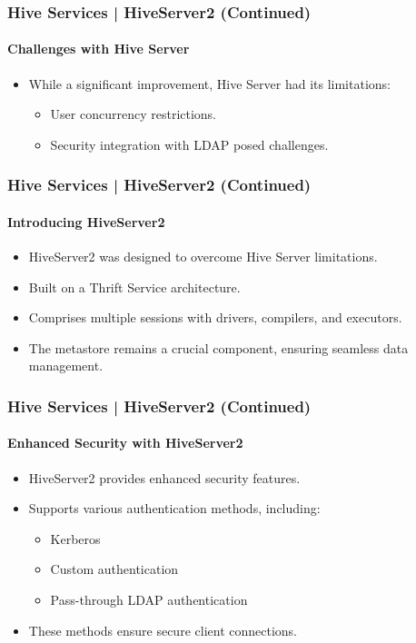 	\begin{frame}
	\frametitle{Hive Services | HiveServer2 (Continued)}
	\framesubtitle{Challenges with Hive Server}
	
	\begin{itemize}
	  \item While a significant improvement, Hive Server had its limitations:
	  \begin{itemize}
		\item User concurrency restrictions.
		\item Security integration with LDAP posed challenges.
	  \end{itemize}
	\end{itemize}
	
	\end{frame}
	
	\begin{frame}
	\frametitle{Hive Services | HiveServer2 (Continued)}
	\framesubtitle{Introducing HiveServer2}
	
	\begin{itemize}
	  \item HiveServer2 was designed to overcome Hive Server limitations.
	  \item Built on a Thrift Service architecture.
	  \item Comprises multiple sessions with drivers, compilers, and executors.
	  \item The metastore remains a crucial component, ensuring seamless data management.
	\end{itemize}
	
	\end{frame}
	
	\begin{frame}
	\frametitle{Hive Services | HiveServer2 (Continued)}
	\framesubtitle{Enhanced Security with HiveServer2}
	
	\begin{itemize}
	  \item HiveServer2 provides enhanced security features.
	  \item Supports various authentication methods, including:
	  \begin{itemize}
		\item Kerberos
		\item Custom authentication
		\item Pass-through LDAP authentication
	  \end{itemize}
	  \item These methods ensure secure client connections.
	\end{itemize}
	
	\end{frame}
	
